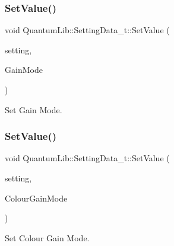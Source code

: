 \subsubsection{\texorpdfstring{Set\+Value()}{SetValue()}\hspace{0.1cm}{\footnotesize\ttfamily [13/26]}}
{\footnotesize\ttfamily void Quantum\+Lib\+::\+Setting\+Data\+\_\+t\+::\+Set\+Value (\begin{DoxyParamCaption}\item[{\mbox{\hyperlink{namespace_quantum_lib_acc8124e3e65bca4aa798d03a55e3d54c}{e\+Settings\+\_\+t}}}]{setting,  }\item[{\mbox{\hyperlink{namespace_quantum_lib_a20b6e658baa33fde788739a47dab2e13}{e\+Gain\+Mode\+\_\+t}}}]{Gain\+Mode }\end{DoxyParamCaption})\hspace{0.3cm}{\ttfamily [inline]}}



Set Gain Mode. 

\mbox{\label{struct_quantum_lib_1_1_setting_data__t_a2e8563582f8c8e615aa52714459eca5c}} 
\subsubsection{\texorpdfstring{Set\+Value()}{SetValue()}\hspace{0.1cm}{\footnotesize\ttfamily [14/26]}}
{\footnotesize\ttfamily void Quantum\+Lib\+::\+Setting\+Data\+\_\+t\+::\+Set\+Value (\begin{DoxyParamCaption}\item[{\mbox{\hyperlink{namespace_quantum_lib_acc8124e3e65bca4aa798d03a55e3d54c}{e\+Settings\+\_\+t}}}]{setting,  }\item[{\mbox{\hyperlink{namespace_quantum_lib_a4e404872667f9386ba59973f4b29fe65}{e\+Colour\+Gain\+Mode\+\_\+t}}}]{Colour\+Gain\+Mode }\end{DoxyParamCaption})\hspace{0.3cm}{\ttfamily [inline]}}



Set Colour Gain Mode. 

\mbox{\label{struct_quantum_lib_1_1_setting_data__t_a8c95fd319a3a2c4b1384f7ee59aaf148}} 
